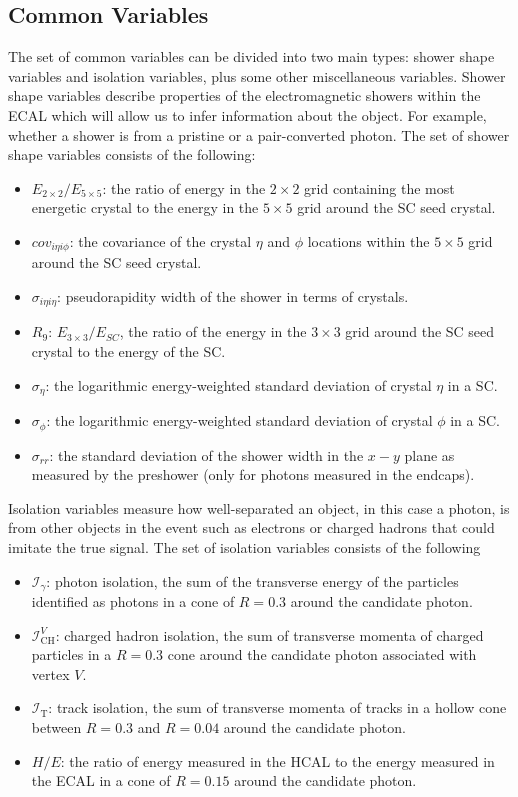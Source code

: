 \subsection{Common Variables}
The set of common variables can be divided into two main types: shower shape variables and isolation variables, plus some other miscellaneous variables. 
Shower shape variables describe properties of the electromagnetic showers within the ECAL which will allow us to infer information about the object. For example, whether a shower is from a pristine or a pair-converted photon.
The set of shower shape variables consists of the following:
\begin{itemize}[noitemsep]
    \item $E_{2\times{}2}/E_{5\times{}5}$: the ratio of energy in the $2\times{}2$ grid containing the most energetic crystal to the energy in the $5\times{}5$ grid around the SC seed crystal.
    \item $cov_{i\eta{i}\phi}$: the covariance of the crystal $\eta$ and $\phi$ locations within the $5\times{}5$ grid around the SC seed crystal. 
    \item $\sigma_{i\eta{}i\eta}$: pseudorapidity width of the shower in terms of crystals. 
    \item $R_{9}$: $E_{3\times{}3}/E_{SC}$, the ratio of the energy in the $3\times{}3$ grid around the SC seed crystal to the energy of the SC.
    \item $\sigma_{\eta}$: the logarithmic energy-weighted standard deviation of crystal $\eta$ in a SC.
    \item $\sigma_{\phi}$: the logarithmic energy-weighted standard deviation of crystal $\phi$ in a SC.
    \item $\sigma_{rr}$: the standard deviation of the shower width in the $x-y$ plane as measured by the preshower (only for photons measured in the endcaps).
\end{itemize}


Isolation variables measure how well-separated an object, in this case a photon, is from other objects in the event such as electrons or charged hadrons that could imitate the true signal. The set of isolation variables consists of the following
\begin{itemize}[noitemsep]
    \item $\mathcal{I}_{\gamma}$: photon isolation, the sum of the transverse energy of the particles identified as photons in a cone of $R=0.3$ around the candidate photon.
    \item $\mathcal{I}^{V}_{\mathrm{CH}}$: charged hadron isolation, the sum of transverse momenta of charged particles in a $R=0.3$ cone around the candidate photon associated with vertex $V$. 
    \item $\mathcal{I}_{\mathrm{T}}$: track isolation, the sum of transverse momenta of tracks in a hollow cone between $R=0.3$ and $R=0.04$ around the candidate photon.
    \item $H/E$: the ratio of energy measured in the HCAL to the energy measured in the ECAL in a cone of $R=0.15$ around the candidate photon.
\end{itemize}

